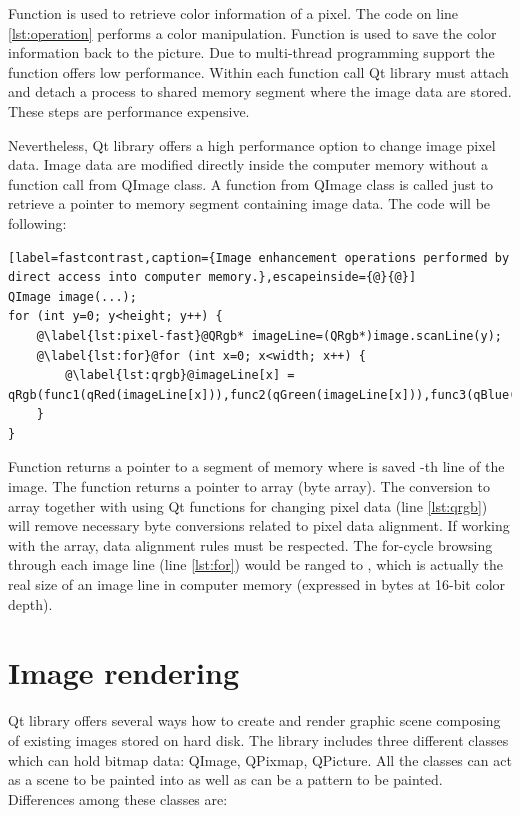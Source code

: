 Function  is used to retrieve color information of a pixel. The code on line \ref{lst:operation} performs a color manipulation. Function  is used to save the color information back to the picture. Due to multi-thread programming support the  function offers low performance. Within each function call Qt library must attach and detach a process to shared memory segment where the image data are stored. These steps are performance expensive.

Nevertheless, Qt library offers a high performance option to change image pixel data. Image data are modified directly inside the computer memory without a function call from QImage class. A function from QImage class is called just to retrieve a pointer to memory segment containing image data. The code will be following:

\begin{lstlisting}[label=fastcontrast,caption={Image enhancement operations performed by direct access into computer memory.},escapeinside={@}{@}]
QImage image(...);
for (int y=0; y<height; y++) {
	@\label{lst:pixel-fast}@QRgb* imageLine=(QRgb*)image.scanLine(y);
	@\label{lst:for}@for (int x=0; x<width; x++) {
		@\label{lst:qrgb}@imageLine[x] = qRgb(func1(qRed(imageLine[x])),func2(qGreen(imageLine[x])),func3(qBlue(imageLine[x])));
	}
}
\end{lstlisting}

Function  returns a pointer to a segment of memory where is saved -th line of the image. The  function returns a pointer to  array (byte array). The conversion to  array together with using Qt functions for changing pixel data (line \ref{lst:qrgb}) will remove necessary byte conversions related to pixel data alignment. If working with the  array, data alignment rules must be respected. The for-cycle browsing through each image line (line \ref{lst:for}) would be ranged to , which is actually the real size of an image line in computer memory (expressed in bytes at 16-bit color depth).


\section{Image rendering}
\label{rendering}
Qt library offers several ways how to create and render graphic scene composing of existing images stored on hard disk. The library includes three different classes which can hold bitmap data: QImage, QPixmap, QPicture. All the classes can act as a scene to be painted into as well as can be a pattern to be painted. Differences among these classes are:

